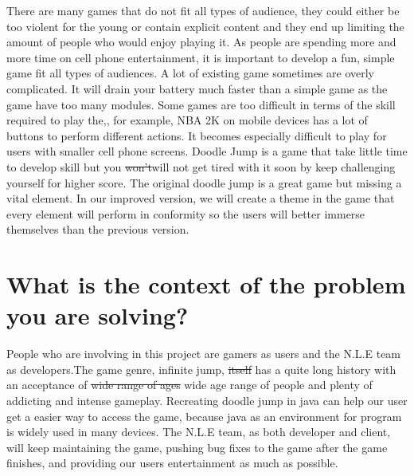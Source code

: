 \documentclass{article}
\newcommand{\rev}[1]{\textcolor{RevisionColour}{#1}}
\begin{document}
There are many games that do not fit all types of audience, they could either be too violent for the young or contain explicit content and they end up limiting the amount of people who would enjoy playing it.  As people are spending more and more time on cell phone entertainment,  it is important to develop a fun, simple game fit all types of audiences.\newline\newline
A lot of existing game sometimes are overly complicated.  It will drain your battery much faster than a simple game as the game have too many modules.  Some games are too difficult in terms of the skill required to play the,, for example, NBA 2K on mobile devices has a lot of buttons to perform different actions.  It becomes especially difficult to play for users with smaller cell phone screens.\newline\newline
Doodle Jump is a game that take little time to develop skill but you \sout{won’t}\rev{will not} get tired with it soon by keep challenging yourself for higher score.\newline\newline
The original doodle jump is a great game but missing a vital element.  In our improved version, we will create a theme in the game that every element will perform in conformity so the users will better immerse themselves than the previous version.  


\section{What is the context of the problem you are solving?}
People who are involving in this project are gamers as users and the N.L.E team as developers.The game genre, infinite jump, \sout{itself} has a quite long history with an acceptance of \sout{wide range of ages} \rev{wide age range} of people and plenty of addicting and intense gameplay. Recreating doodle jump in java can help our user get a easier way to access the game, because java as an environment for program is widely used in many devices. The N.L.E team, as both developer and client, will keep maintaining the game, push\rev{ing} bug fixes to the game after the game finishes, and provid\rev{ing} our users entertainment as much as possible.
\end{document}
